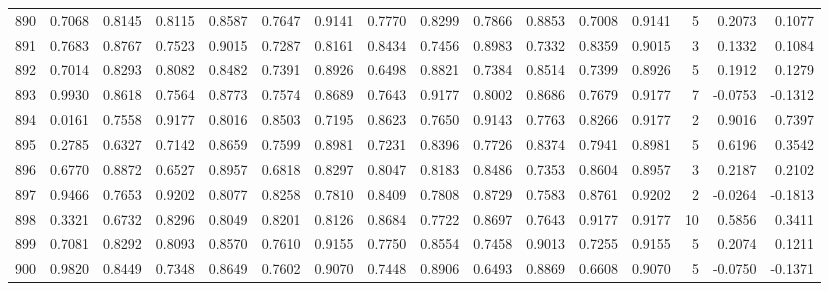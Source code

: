\begin{tabular}{lrrrrrrrrrrrrrrr}
890 &      0.7068 &  0.8145 &  0.8115 &  0.8587 &  0.7647 &  0.9141 &  0.7770 &  0.8299 &  0.7866 &  0.8853 &   0.7008 &     0.9141 &      5 &                    0.2073 &                     0.1077 \\
891 &      0.7683 &  0.8767 &  0.7523 &  0.9015 &  0.7287 &  0.8161 &  0.8434 &  0.7456 &  0.8983 &  0.7332 &   0.8359 &     0.9015 &      3 &                    0.1332 &                     0.1084 \\
892 &      0.7014 &  0.8293 &  0.8082 &  0.8482 &  0.7391 &  0.8926 &  0.6498 &  0.8821 &  0.7384 &  0.8514 &   0.7399 &     0.8926 &      5 &                    0.1912 &                     0.1279 \\
893 &      0.9930 &  0.8618 &  0.7564 &  0.8773 &  0.7574 &  0.8689 &  0.7643 &  0.9177 &  0.8002 &  0.8686 &   0.7679 &     0.9177 &      7 &                   -0.0753 &                    -0.1312 \\
894 &      0.0161 &  0.7558 &  0.9177 &  0.8016 &  0.8503 &  0.7195 &  0.8623 &  0.7650 &  0.9143 &  0.7763 &   0.8266 &     0.9177 &      2 &                    0.9016 &                     0.7397 \\
895 &      0.2785 &  0.6327 &  0.7142 &  0.8659 &  0.7599 &  0.8981 &  0.7231 &  0.8396 &  0.7726 &  0.8374 &   0.7941 &     0.8981 &      5 &                    0.6196 &                     0.3542 \\
896 &      0.6770 &  0.8872 &  0.6527 &  0.8957 &  0.6818 &  0.8297 &  0.8047 &  0.8183 &  0.8486 &  0.7353 &   0.8604 &     0.8957 &      3 &                    0.2187 &                     0.2102 \\
897 &      0.9466 &  0.7653 &  0.9202 &  0.8077 &  0.8258 &  0.7810 &  0.8409 &  0.7808 &  0.8729 &  0.7583 &   0.8761 &     0.9202 &      2 &                   -0.0264 &                    -0.1813 \\
898 &      0.3321 &  0.6732 &  0.8296 &  0.8049 &  0.8201 &  0.8126 &  0.8684 &  0.7722 &  0.8697 &  0.7643 &   0.9177 &     0.9177 &     10 &                    0.5856 &                     0.3411 \\
899 &      0.7081 &  0.8292 &  0.8093 &  0.8570 &  0.7610 &  0.9155 &  0.7750 &  0.8554 &  0.7458 &  0.9013 &   0.7255 &     0.9155 &      5 &                    0.2074 &                     0.1211 \\
900 &      0.9820 &  0.8449 &  0.7348 &  0.8649 &  0.7602 &  0.9070 &  0.7448 &  0.8906 &  0.6493 &  0.8869 &   0.6608 &     0.9070 &      5 &                   -0.0750 &                    -0.1371 \\

\end{tabular}
